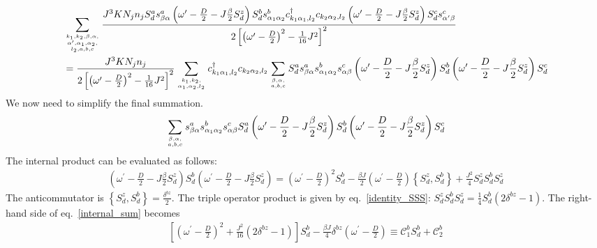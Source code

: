 \documentclass{revtex4-2}
\numberwithin{equation}{section}
\begin{document}
\begin{equation}\begin{aligned}
	\label{first_term}
	&\sum_{k_1,k_2,\beta,\alpha, \atop{\alpha^\prime, \alpha_1,\alpha_2,\atop{l_2,a,b,c}}}\frac{J^3 K N_j n_j  S_d^a s^a_{\beta \alpha} \left(\omega^\prime - \frac{D}{2} - J \frac{\beta}{2}S_d^z\right)S_d^b s^b_{\alpha_1 \alpha_2} c^\dagger_{k_1\alpha_1,l_2}c_{k_2 \alpha_2,l_2} \left(\omega^\prime - \frac{D}{2} - J \frac{\beta}{2}S_d^z\right) S_d^c s^c_{\alpha^\prime \beta}}{2\left[\left(\omega^\prime - \frac{D}{2}\right)^2 - \frac{1}{16}J^2\right]^2} \\
	&= \frac{J^3 K N_j n_j }{2\left[\left(\omega^\prime - \frac{D}{2}\right)^2 - \frac{1}{16}J^2\right]^2}\sum_{k_1,k_2,\atop{\alpha_1,\alpha_2,l_2}}c^\dagger_{k_1\alpha_1,l_2}c_{k_2 \alpha_2,l_2} \sum_{\beta,\alpha, \atop{a,b,c}}S_d^a s^a_{\beta \alpha} s^b_{\alpha_1 \alpha_2}s^c_{\alpha \beta} \left(\omega^\prime - \frac{D}{2} - J \frac{\beta}{2}S_d^z\right)S_d^b \left(\omega^\prime - \frac{D}{2} - J \frac{\beta}{2}S_d^z\right) S_d^c 
\end{aligned}\end{equation}
We now need to simplify the final summation.
\begin{equation}\begin{aligned}
	\label{final_sum}
\sum_{\beta,\alpha, \atop{a,b,c}}s^a_{\beta \alpha} s^b_{\alpha_1 \alpha_2}s^c_{\alpha \beta} S_d^a \left(\omega^\prime - \frac{D}{2} - J \frac{\beta}{2}S_d^z\right)S_d^b\left(\omega^\prime - \frac{D}{2} - J \frac{\beta}{2}S_d^z\right) S_d^c 
\end{aligned}\end{equation}
The internal product can be evaluated as follows:
\begin{equation}\begin{aligned}
	\label{internal_sum}
	\left(\omega^\prime - \frac{D}{2} - J \frac{\beta}{2}S_d^z\right)S_d^b\left(\omega^\prime - \frac{D}{2} - J \frac{\beta}{2}S_d^z\right) = \left(\omega^\prime - \frac{D}{2}\right)^2 S_d^b - \frac{\beta J}{2}\left(\omega^\prime - \frac{D}{2}\right)\left\{S_d^z, S_d^b\right\} + \frac{J^2}{4}S_d^z S_d^b S_d^z
\end{aligned}\end{equation}
The anticommutator is \(\left\{S_d^z, S_d^b\right\} = \frac{\delta^{bz}}{2}\). The triple operator product is given by eq.~\ref{identity_SSS}: \(S_d^z S_d^b S_d^z = \frac{1}{4}S_d^b\left(2\delta^{bz} - 1\right)\). The right-hand side of eq.~\ref{internal_sum} becomes
\begin{equation}\begin{aligned}
	\left[\left(\omega^\prime - \frac{D}{2}\right)^2 + \frac{J^2}{16} \left(2\delta^{bz} - 1\right)\right]S_d^b - \frac{\beta J}{4}\delta^{bz}\left(\omega^\prime - \frac{D}{2}\right) \equiv \mathcal{C}_1^b S_d^b + \mathcal{C}_2^b
\end{aligned}\end{equation}
\end{document}
